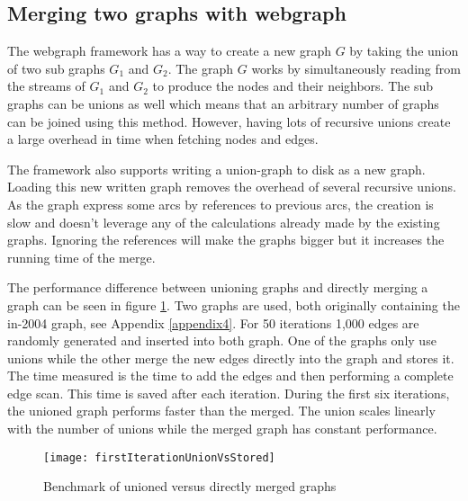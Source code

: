 \subsection{Merging two graphs with webgraph}

The webgraph framework has a way to create a new graph $G$ by taking the union of two sub graphs $G_1$ and $G_2$. The graph $G$ works by simultaneously reading from the streams of $G_1$ and $G_2$ to produce the nodes and their neighbors. The sub graphs can be unions as well which means that an arbitrary number of graphs can be joined using this method. However, having lots of recursive unions create a large overhead in time  when fetching nodes and edges. \cite{webgraph} 

The framework also supports writing a union-graph to disk as a new graph. Loading this new written graph removes the overhead of several recursive unions. As the graph express some arcs by references to previous arcs, the creation is slow and doesn't leverage any of the calculations already made by the existing graphs. Ignoring the references will make the graphs bigger but it increases the running time of the merge.

The performance difference between unioning graphs and directly merging a graph can be seen in figure \ref{fig:firstIterationUnionVsStored}. Two graphs are used, both originally containing the in-2004 graph, see Appendix \ref{appendix4}. For 50 iterations 1,000 edges are randomly generated and inserted into both graph. One of the graphs only use unions while the other merge the new edges directly into the graph and stores it. The time measured is the time to add the edges and then performing a complete edge scan. This time is saved after each iteration. During the first six iterations, the unioned graph performs faster than the merged. The union scales linearly with the number of unions while the merged graph has constant performance.  

\begin{figure}[h]
\centering
\texttt{[image: firstIterationUnionVsStored]}    
\captionsetup{justification=centering}
\caption {Benchmark of unioned versus directly merged graphs}
\label{fig:firstIterationUnionVsStored}
\end{figure}

